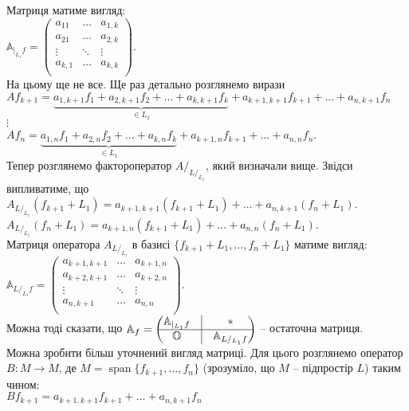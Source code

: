 \documentclass[a4paper, 10pt]{article}
\theoremstyle{theoremdd}
\DeclareMathOperator{\linspan}{span}
\begin{document}
Матриця матиме вигляд:\\
$\mathbb{A}_{|_{L_1}f} = \begin{pmatrix}
a_{11} & \dots & a_{1,k}\\
a_{21} & \dots & a_{2,k}\\
\vdots & \ddots & \vdots\\
a_{k,1} & \dots & a_{k,k}\\
\end{pmatrix}$.\\
На цьому ще не все. Ще раз детально розглянемо вирази\\
$Af_{k+1} = \underbrace{a_{1,k+1}f_1 + a_{2,k+1}f_2 + \dots + a_{k,k+1}f_k}_{\in L_1} + a_{k+1,k+1}f_{k+1} + \dots + a_{n,k+1}f_n$\\
$\vdots$\\
$Af_n = \underbrace{a_{1,n}f_1 + a_{2,n}f_2 + \dots + a_{k,n}f_k}_{\in L_1} + a_{k+1,n}f_{k+1} + \dots + a_{n,n}f_n$.\\
Тепер розглянемо фактороператор $A/_{L/_{L_1}}$, який визначали вище. Звідси випливатиме, що\\ 
$A_{L/_{L_1}}(f_{k+1} + L_1) = a_{k+1,k+1}(f_{k+1}+L_1) + \dots + a_{n,k+1}(f_n+L_1)$.\\
$A_{L/_{L_1}}(f_{n} + L_1) = a_{k+1,n}(f_{k+1}+L_1) + \dots + a_{n,n}(f_n + L_1)$.\\
Матриця оператора $A_{L/_{L_1}}$ в базисі $\{f_{k+1}+L_1,\dots,f_n+L_1\}$ матиме вигляд:\\
$\mathbb{A}_{L/_{L_1} f} = \begin{pmatrix}
a_{k+1,k+1} & \dots & a_{k+1, n} \\
a_{k+2,k+1} &  \dots & a_{k+2, n} \\
\vdots & \ddots & \vdots \\
a_{n,k+1} & \dots & a_{n, n} \\
\end{pmatrix}$.\\
Можна тоді сказати, що 
$\mathbb{A}_f = \begin{pmatrix}
 \mathbb{A}_{|_{L_1}f}  & \vline & * \\
 \hline
 \mathbb{O} & \vline & \mathbb{A}_{L/_{L_1} f}
\end{pmatrix}$ -- остаточна матриця.
\iffalse
\bigskip \\
Можна зробити більш уточнений вигляд матриці. Для цього розглянемо оператор $B \colon M \to M$, де $M = \linspan\{f_{k+1},\dots,f_n\}$ (зрозуміло, що $M$ -- підпростір $L$) таким чином:\\
$Bf_{k+1} = a_{k+1,k+1}f_{k+1} + \dots + a_{n,k+1}f_n$\\
\end{document}
